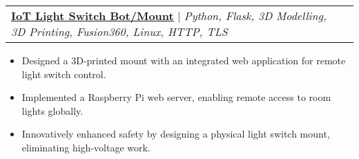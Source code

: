 \documentclass[letterpaper]{article}
\makeatletter
\newcommand{\resumeItem}[1]{
  \item\small{
    {#1 \vspace{-2pt}}
  }
}
\newcommand{\resumeProjectHeading}[2]{
    \item
    \begin{tabular*}{0.97\textwidth}{l@{\extracolsep{\fill}}r}
      \small#1 & #2 \\
    \end{tabular*}\vspace{-7pt}
}
\newcommand{\resumeItemListStart}{\begin{itemize}}
\newcommand{\resumeItemListEnd}{\end{itemize}\vspace{-5pt}}
\makeatother
\begin{document}
      \resumeProjectHeading
          {\textbf{\underline{\href{https://www.gavintranquilino.com/light-switch.html}{IoT Light Switch Bot/Mount}}} $|$ \emph{Python, Flask, 3D Modelling, 3D Printing, Fusion360, Linux, HTTP, TLS}}{}
          \resumeItemListStart
            \resumeItem{Designed a 3D-printed mount with an integrated web application for remote light switch control.}
            \resumeItem{Implemented a Raspberry Pi web server, enabling remote access to room lights globally.}
            \resumeItem{Innovatively enhanced safety by designing a physical light switch mount, eliminating high-voltage work.}
          \resumeItemListEnd




\end{document}
